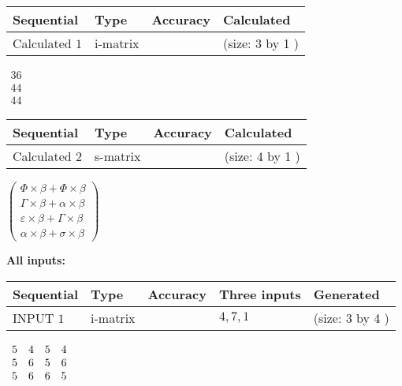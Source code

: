 \documentclass[12pt]{article}
\begin{document}
  
\noindent\begin{tabular}{|l|l|l|l|}
\hline
 Sequential & Type & Accuracy & Calculated \\ 
\hline
 
 
  Calculated $            1 $ & i-matrix &  & 
 (size:            3  by            1 )
 \\  \hline  
 \end{tabular}
   
   
$\begin{array}{
 c
 }
          36  \\ 
          44  \\ 
          44
 \end{array}  $ 
  
  
\noindent\begin{tabular}{|l|l|l|l|}
\hline
 Sequential & Type & Accuracy & Calculated \\ 
\hline
 
 
  Calculated $            2 $ & s-matrix & & 
 (size:            4  by            1 )
 \\  \hline  
 \end{tabular}
   
   
 $  \left( \begin{array}
 {
 c
 }
  \Phi \times  \beta +  \Phi \times  \beta \\ 
  \Gamma \times  \beta +  \alpha \times  \beta \\ 
  \varepsilon \times  \beta +  \Gamma \times  \beta \\ 
  \alpha \times  \beta +  \sigma \times  \beta
 \end{array} \right) $ 
   
   
\noindent\vspace{0.1in}\hspace{-0.08in} {\textbf{\Large{All inputs: }}}
   
   
  
  
\noindent\begin{tabular}{|l|l|l|l|l|}
\hline
 Sequential & Type & Accuracy & Three inputs & Generated \\ 
\hline
 
 
  INPUT $            1 $ & i-matrix &  & $
 4
 , 
 7
 , 
 1
 $ & (size:            3  by            4 )
 \\  \hline  
 \end{tabular}
   
   
 $\begin{array}{
 c
 c
 c
 c
 }
           5  & 
           4  & 
           5  & 
           4  \\ 
           5  & 
           6  & 
           5  & 
           6  \\ 
           5  & 
           6  & 
           6  & 
           5
\end{array}  $ 
  
\end{document}
